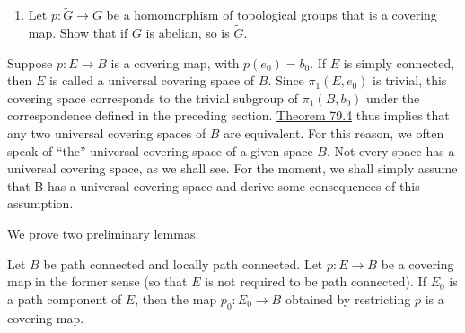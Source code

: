 \begin{enumerate}[itemsep=0.4em, parsep=0pt, topsep=0pt, partopsep=0pt, leftmargin=*, label=\arabic*., ref=\arabic*]
\begin{enumerate}[itemsep=0.2em, parsep=0pt, topsep=0pt, partopsep=0pt, leftmargin=*, label=(\alph*), align=left]
 \item Complete the proof.
 \end{enumerate}
\item[7.] Let \(p : \widetilde{G} \rightarrow G\) be a homomorphism of topological groups that is a covering map. Show that if \(G\) is abelian, so is \(\widetilde{G}\).
\end{enumerate}

Suppose \(p : E \rightarrow B\) is a covering map, with \(p( e_{0}) = b_{0}\). If \(E\) is simply connected, then \(E\) is called a universal covering space of \(B\). Since \({\pi }_{1}( {E,e_{0}})\) is trivial, this covering space corresponds to the trivial subgroup of \({\pi }_{1}( {B,b_{0}})\) under the correspondence defined in the preceding section. \hyperref[thm:79.4]{Theorem 79.4} thus implies that any two universal covering spaces of \(B\) are equivalent. For this reason, we often speak of ``the'' universal covering space of a given space \(B\). Not every space has a universal covering space, as we shall see. For the moment, we shall simply assume that B has a universal covering space and derive some consequences of this assumption.

We prove two preliminary lemmas:

\begin{lemma}
\label{lem:\thetheorem}
	Let \(B\) be path connected and locally path connected. Let \(p : E \rightarrow B\) be a covering map in the former sense (so that \(E\) is not required to be path connected). If \(E_{0}\) is a path component of \(E\), then the map \(p_{0} : E_{0} \rightarrow B\) obtained by restricting \(p\) is a covering map.
\end{lemma}


